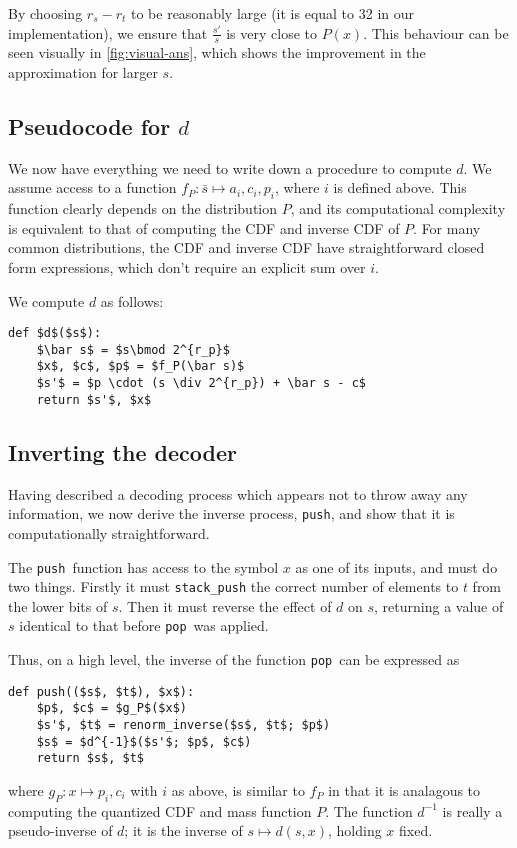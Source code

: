 \documentclass{article}
\newcommand{\push}{\texttt{push}}
\newcommand{\pop}{\texttt{pop}}
\begin{document}
By choosing $r_s - r_t$ to be reasonably
large (it is equal to 32 in our implementation), we ensure that
$\frac{s'}{s}$ is very close to $P(x)$. This behaviour can be seen visually in
\cref{fig:visual-ans}, which shows the improvement in the approximation for
larger $s$.

\subsection*{Pseudocode for $d$}
We now have everything we need to write down a procedure to compute $d$. We
assume access to a function $f_P:\bar{s}\mapsto a_i, c_i, p_i$, where $i$ is
defined above. This function clearly depends on the distribution $P$, and its
computational complexity is equivalent to that of computing the CDF and inverse
CDF of $P$. For many common distributions, the CDF and inverse CDF have
straightforward closed form expressions, which don't require an explicit sum
over $i$.

We compute $d$ as follows:
\begin{lstlisting}
def $d$($s$):
    $\bar s$ = $s\bmod 2^{r_p}$
    $x$, $c$, $p$ = $f_P(\bar s)$
    $s'$ = $p \cdot (s \div 2^{r_p}) + \bar s - c$
    return $s'$, $x$
\end{lstlisting}

\subsection*{Inverting the decoder}
Having described a decoding process which appears not to throw away any
information, we now derive the inverse process, \push, and show that it is
computationally straightforward.

The \push\ function has access to the symbol $x$ as one of its inputs, and must
do two things. Firstly it must \texttt{stack\_push} the correct number of
elements to $t$ from the lower bits of $s$. Then it must reverse the effect of
$d$ on $s$, returning a value of $s$ identical to that before \pop\ was
applied.

Thus, on a high level, the inverse of the function \pop\ can be expressed as
\begin{lstlisting}
def push(($s$, $t$), $x$):
    $p$, $c$ = $g_P$($x$)
    $s'$, $t$ = renorm_inverse($s$, $t$; $p$)
    $s$ = $d^{-1}$($s'$; $p$, $c$)
    return $s$, $t$
\end{lstlisting}
where $g_P:x\mapsto p_i, c_i$ with $i$ as above, is similar to $f_P$ in that it
is analagous to computing the quantized CDF and mass function $P$. The function
$d^{-1}$ is really a pseudo-inverse of $d$; it is the inverse of $s\mapsto
d(s, x)$, holding $x$ fixed.
\end{document}
